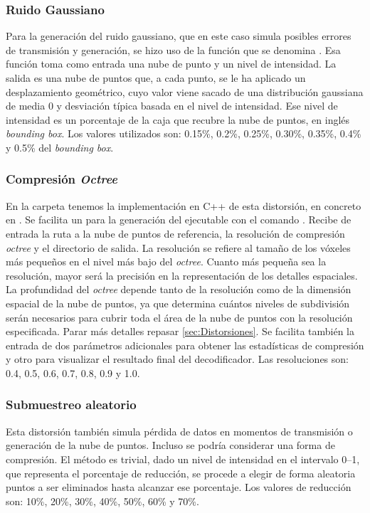 \subsubsection*{Ruido Gaussiano} 
Para la generación del ruido gaussiano, que en este caso simula posibles 
errores de transmisión y generación, se hizo uso de la función que se denomina
. 
Esa función toma como entrada 
una nube de punto y un nivel de intensidad. La salida es una nube de puntos que, 
a cada punto, se le ha aplicado un desplazamiento geométrico, cuyo valor 
viene sacado de una distribución gaussiana de media 0 y desviación típica 
basada en el nivel de intensidad. Ese nivel de intensidad es un porcentaje 
de la caja que recubre la nube de puntos, en inglés \emph{bounding box}.
Los valores utilizados son: 0.15\%, 0.2\%, 0.25\%, 0.30\%, 0.35\%, 0.4\% y 0.5\%
del \emph{bounding box}.
\subsubsection*{Compresión \emph{Octree}}
En la carpeta  tenemos la implementación en C++ de esta 
distorsión, en concreto en . Se facilita 
un  para la generación del ejecutable con el comando 
. Recibe de entrada la ruta a la nube de puntos de referencia, 
la resolución de compresión \emph{octree} y el directorio de salida. 
La resolución se refiere al tamaño de los vóxeles más pequeños en el nivel más 
bajo del \emph{octree}. Cuanto más pequeña sea la resolución, mayor será la precisión 
en la representación de los detalles espaciales. 
La profundidad del \emph{octree} depende tanto de la resolución como de la dimensión 
espacial de la nube de puntos, ya que determina cuántos niveles de subdivisión 
serán necesarios para cubrir toda el área de la nube de puntos con la resolución 
especificada. Parar más detalles repasar \ref{sec:Distorsiones}. 
Se facilita también la entrada de dos parámetros adicionales para obtener 
las estadísticas de compresión y otro para visualizar el resultado final del 
decodificador. Las resoluciones son: 0.4, 0.5, 0.6, 0.7, 0.8, 0.9 y 1.0.
\subsubsection*{Submuestreo aleatorio}
Esta distorsión también simula pérdida de datos en momentos de transmisión o 
generación de la nube de puntos. Incluso se podría considerar una forma de 
compresión. El método es trivial, dado un nivel de intensidad en el intervalo 
0--1, que representa el porcentaje de reducción, se procede a elegir de forma 
aleatoria puntos a ser eliminados hasta alcanzar ese porcentaje. Los valores 
de reducción son: 10\%, 20\%, 30\%, 40\%, 50\%, 60\% y 70\%.
